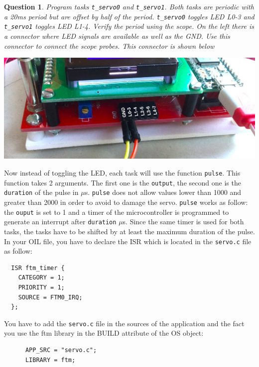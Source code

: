\documentclass[11pt]{report}
\newtheorem{ex}{Question}
\begin{document}
\begin{ex}
Program tasks \texttt{t_servo0} and \texttt{t_servo1}. Both tasks are periodic with a 20ms period but are offset by half of the period. \texttt{t_servo0} toggles LED L0-3 and \texttt{t_servo1} toggles LED L1-4. Verify the period using the scope. On the left there is a connector where LED signals are available as well as the GND. Use this connector to connect the scope probes. This connector is shown below
\end{ex}

\begin{center}
   \includegraphics[scale=0.25]{connecteurgauche.jpg} 
\end{center}



Now instead of toggling the LED, each task will use the function \texttt{pulse}. This function takes 2 arguments. The first one is the \texttt{output}, the second one is the \texttt{duration} of the pulse in $\mu$s.  \texttt{pulse} does not allow values lower than 1000 and greater than 2000 in order to avoid to damage the servo. \texttt{pulse} works as follow: the \texttt{ouput} is set to 1 and a timer of the microcontroller is programmed to generate an interrupt after \texttt{duration} $\mu$s. Since the same timer is used for both tasks, the tasks have to be shifted by at least the maximum duration of the pulse. In your OIL file, you have to declare the ISR which is located in the \texttt{servo.c} file as follow:

\begin{lstlisting}
  ISR ftm_timer {
    CATEGORY = 1;
    PRIORITY = 1;
    SOURCE = FTM0_IRQ;
  };
\end{lstlisting}

You have to add the \texttt{servo.c} file in the sources of the application  and the fact you use the ftm library in the BUILD attribute of the OS object:

\begin{lstlisting}
      APP_SRC = "servo.c";
      LIBRARY = ftm;
\end{lstlisting}
\end{document}
